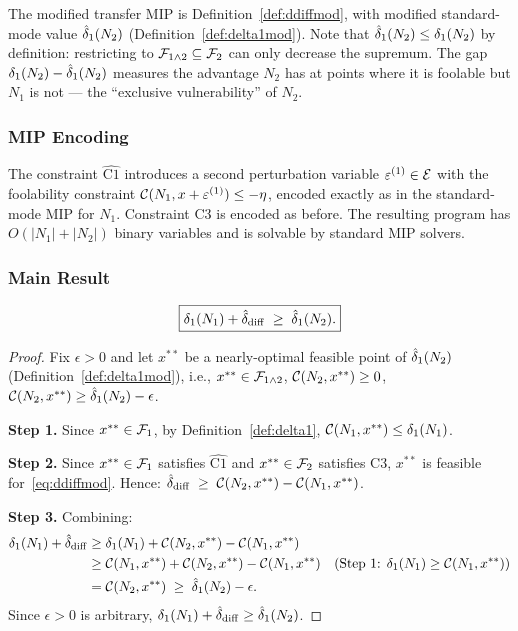 The modified transfer MIP is Definition~\ref{def:ddiffmod}, with modified standard-mode value $\hat{\delta}_1(N_{2})$ (Definition~\ref{def:delta1mod}). Note that $\hat{\delta}_1(N_{2})\leq\delta_1(N_{2})$ by definition: restricting to $\mathcal{F}_{1\wedge 2}\subseteq\mathcal{F}_{2}$ can only decrease the supremum. The gap $\delta_1(N_{2})-\hat{\delta}_1(N_{2})$ measures the advantage $N_2$ has at points where it is foolable but $N_1$ is not --- the ``exclusive vulnerability'' of $N_2$.

\subsubsection{MIP Encoding}

The constraint $\widehat{\mathrm{C1}}$ introduces a second perturbation variable $\varepsilon^{(1)}\in\mathcal{E}$ with the foolability constraint $\mathcal{C}(N_1,x+\varepsilon^{(1)})\leq-\eta$, encoded exactly as in the standard-mode MIP for $N_1$. Constraint C3 is encoded as before. The resulting program has $O(|N_1|+|N_2|)$ binary variables and is solvable by standard MIP solvers.

\subsubsection{Main Result}

\begin{theorem}
  \label{thm:modified}
  \[
    \boxed{\delta_1(N_{1}) + \hat{\delta}_{\mathrm{diff}} \;\geq\; \hat{\delta}_1(N_{2}).}
  \]
\end{theorem}

\begin{proof}
  Fix $\epsilon>0$ and let $x^{**}$ be a nearly-optimal feasible point of $\hat{\delta}_1(N_{2})$ (Definition~\ref{def:delta1mod}), i.e., $x^{**}\in\mathcal{F}_{1\wedge 2}$, $\mathcal{C}(N_2,x^{**})\geq 0$, $\mathcal{C}(N_2,x^{**})\geq\hat{\delta}_1(N_{2})-\epsilon$.

  \textbf{Step 1.} Since $x^{**}\in\mathcal{F}_{1}$, by Definition~\ref{def:delta1}, $\mathcal{C}(N_1,x^{**})\leq\delta_1(N_{1})$.

  \textbf{Step 2.} Since $x^{**}\in\mathcal{F}_{1}$ satisfies $\widehat{\mathrm{C1}}$ and $x^{**}\in\mathcal{F}_{2}$ satisfies C3, $x^{**}$ is feasible for~\eqref{eq:ddiffmod}. Hence: $\hat{\delta}_{\mathrm{diff}} \;\geq\; \mathcal{C}(N_2,x^{**})-\mathcal{C}(N_1,x^{**})$.

  \textbf{Step 3.} Combining:
  \begin{align*}
    \delta_1(N_{1})+\hat{\delta}_{\mathrm{diff}}
    &\geq\delta_1(N_{1})+\mathcal{C}(N_2,x^{**})-\mathcal{C}(N_1,x^{**})\\
    &\geq\mathcal{C}(N_1,x^{**})+\mathcal{C}(N_2,x^{**})-\mathcal{C}(N_1,x^{**})
    \quad\text{(Step 1: $\delta_1(N_{1})\geq\mathcal{C}(N_1,x^{**})$)}\\
    &=\mathcal{C}(N_2,x^{**}) \;\geq\;\hat{\delta}_1(N_{2})-\epsilon.
  \end{align*}
  Since $\epsilon>0$ is arbitrary, $\delta_1(N_{1})+\hat{\delta}_{\mathrm{diff}}\geq\hat{\delta}_1(N_{2})$.
\end{proof}

